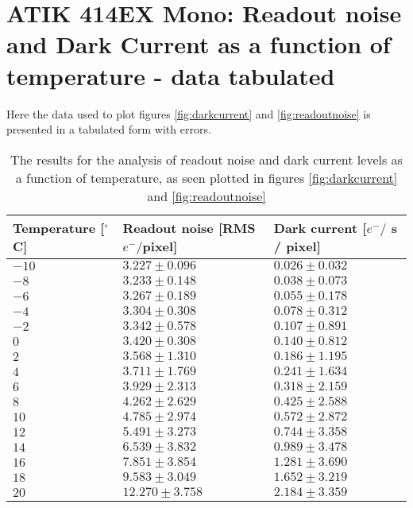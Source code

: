 \documentclass[../main.tex]{subfiles}
\begin{document}
	\newpage
	\appendix
	\chapter{ATIK 414EX Mono: Readout noise and Dark Current as a function of temperature - data tabulated}
	Here the data used to plot figures \ref{fig:darkcurrent} and \ref{fig:readoutnoise} is presented in a tabulated form with errors.
	\begin{table}[]
		\centering
		\begin{tabular}{|l|l|l|}
			\hline
			\rowcolor[HTML]{C0C0C0} 
			{\color[HTML]{000000} \textbf{Temperature {[}$^\circ$C{]}}} & {\color[HTML]{000000} \textbf{Readout noise {[}RMS $e^-/ $pixel{]}}} & {\color[HTML]{000000} \textbf{Dark current {[}$e^- / $ s / pixel{]}}} \\ \hline
			$-10$ & $3.227 \pm 0.096$ & $0.026 \pm 0.032$ \\ \hline
			$-8$ & $3.233 \pm 0.148$ & $0.038 \pm 0.073$ \\ \hline
			$-6$ & $3.267 \pm 0.189$ & $0.055\pm 0.178$ \\ \hline
			$-4$ & $3.304\pm 0.308$ & $0.078\pm0.312$ \\ \hline
			$-2$ & $3.342\pm0.578$ & $0.107\pm0.891$ \\ \hline
			$0$ & $3.420\pm0.308$ & $0.140\pm0.812$ \\ \hline
			$2$ & $3.568\pm1.310$ & $0.186\pm1.195$ \\ \hline
			$4$ & $3.711\pm1.769$ & $0.241\pm1.634$ \\ \hline
			$6$ & $3.929\pm2.313$ & $0.318\pm2.159$ \\ \hline
			$8$ & $4.262\pm2.629$ & $0.425\pm2.588$ \\ \hline
			$10$ & $4.785\pm2.974$ & $0.572\pm2.872$ \\ \hline
			$12$ & $5.491\pm3.273$ & $0.744\pm3.358$ \\ \hline
			$14$ & $6.539\pm3.832$ & $0.989\pm3.478$ \\ \hline
			$16$ & $7.851\pm3.854$ & $1.281\pm3.690$ \\ \hline
			$18$ & $9.583\pm3.049$ & $1.652\pm3.219$ \\ \hline
			$20$ & $12.270\pm3.758$ & $2.184\pm3.359 $ \\ \hline
		\end{tabular}
	\label{table:rondc}
	\caption{The results for the analysis of readout noise and dark current levels as a function of temperature, as seen plotted in figures \ref{fig:darkcurrent} and \ref{fig:readoutnoise}}
	\end{table}
\end{document}

